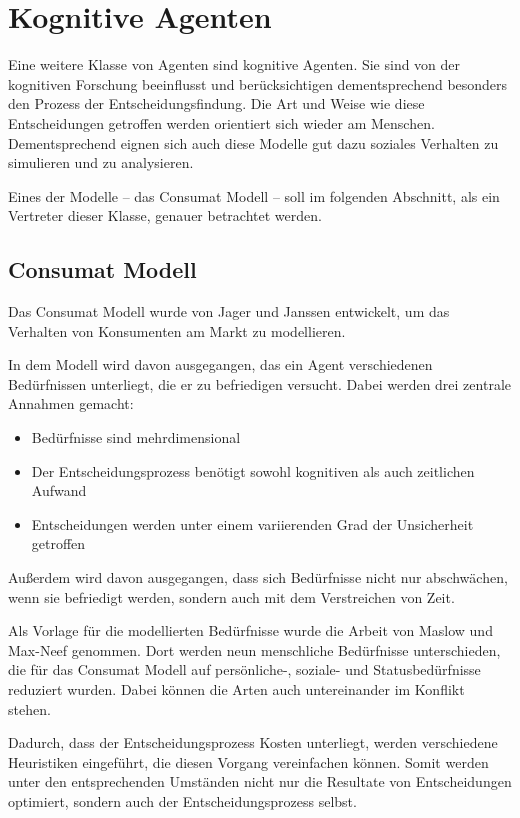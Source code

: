 \chapter{Kognitive Agenten}
Eine weitere Klasse von Agenten sind kognitive Agenten.
Sie sind von der kognitiven Forschung beeinflusst und berücksichtigen dementsprechend besonders den Prozess der Entscheidungsfindung.
Die Art und Weise wie diese Entscheidungen getroffen werden orientiert sich wieder am Menschen.
Dementsprechend eignen sich auch diese Modelle gut dazu soziales Verhalten zu simulieren und zu analysieren.

Eines der Modelle -- das Consumat Modell -- soll im folgenden Abschnitt, als ein Vertreter dieser Klasse, genauer betrachtet werden.

\section{Consumat Modell}
Das Consumat Modell wurde von Jager und Janssen entwickelt, um das Verhalten von Konsumenten am Markt zu modellieren\cite{janssen2001fashions}.

In dem Modell wird davon ausgegangen, das ein Agent verschiedenen Bedürfnissen unterliegt, die er zu befriedigen versucht.
Dabei werden drei zentrale Annahmen gemacht:
\begin{itemize}
    \item Bedürfnisse sind mehrdimensional
    \item Der Entscheidungsprozess benötigt sowohl kognitiven als auch zeitlichen Aufwand
    \item Entscheidungen werden unter einem variierenden Grad der Unsicherheit getroffen
\end{itemize}
Außerdem wird davon ausgegangen, dass sich Bedürfnisse nicht nur abschwächen, wenn sie befriedigt werden, sondern auch mit dem Verstreichen von Zeit.

Als Vorlage für die modellierten Bedürfnisse wurde die Arbeit von Maslow\cite{arlow1955motivation} und Max-Neef\cite{max1992development} genommen.
Dort werden neun menschliche Bedürfnisse unterschieden, die für das Consumat Modell auf persönliche-, soziale- und Statusbedürfnisse reduziert wurden.
Dabei können die Arten auch untereinander im Konflikt stehen.

Dadurch, dass der Entscheidungsprozess Kosten unterliegt, werden verschiedene Heuristiken eingeführt, die diesen Vorgang vereinfachen können.
Somit werden unter den entsprechenden Umständen nicht nur die Resultate von Entscheidungen optimiert, sondern auch der Entscheidungsprozess selbst.

